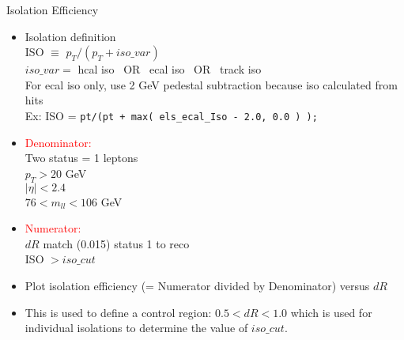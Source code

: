 \documentclass{beamer}
\begin{document}
\begin{frame}[containsverbatim]{Isolation Efficiency}
  \begin{itemize}

  \item Isolation definition\\ ISO $\equiv$ $p_T/(p_T + iso\_var)$\\ \footnotesize{ $iso\_var =$ hcal iso ~OR~ ecal iso ~OR~ track iso} 
    \\ For ecal iso only, use 2 GeV pedestal subtraction because iso calculated from hits
    \\ Ex: ISO = \verb=pt/(pt + max( els_ecal_Iso - 2.0, 0.0 ) );=
  \item \textcolor{red}{Denominator:}\\ Two status = 1 leptons \\ $p_T > 20$ GeV\\ $|\eta| < 2.4$\\ $76 < m_{ll} < 106$ GeV
  \item \textcolor{red}{Numerator:}\\ $dR$ match (0.015) status 1 to reco\\ ISO $> iso\_cut$
  \item Plot isolation efficiency (= Numerator divided by Denominator) versus $dR$
  \item This is used to define a control region: $0.5 < dR < 1.0$ which is used for individual isolations to determine the value of $iso\_cut$.
  \end{itemize}
\end{frame}
\end{document}
